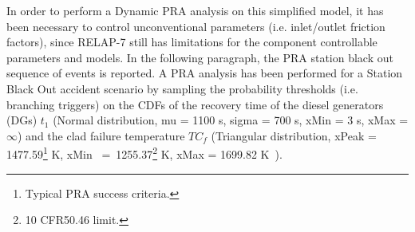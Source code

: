 \documentclass{mc2013}
\begin{document}
In order to perform a Dynamic PRA analysis on this simplified model, it has been necessary to control unconventional parameters (i.e. inlet/outlet friction factors), since RELAP-7 still has limitations for the component controllable parameters and models. In the following paragraph, the PRA station black out sequence of events is reported. 
\label{sec:SBOanalysis}
A PRA analysis has been performed for a Station Black Out accident scenario by sampling the probability thresholds (i.e. branching triggers) on the CDFs of the recovery time of the diesel generators (DGs)  $t_{1}$ (Normal distribution, mu = 1100 s, sigma = 700 s, xMin = 3 s, xMax = $\infty$)  and the clad failure temperature $TC_{f}$  (Triangular distribution, xPeak = 1477.59\footnote{Typical PRA success criteria.} K, xMin~ =~1255.37\footnote{10 CFR50.46 limit.} K, xMax = 1699.82 K~\cite{Urbanic1978}). 
\end{document}
